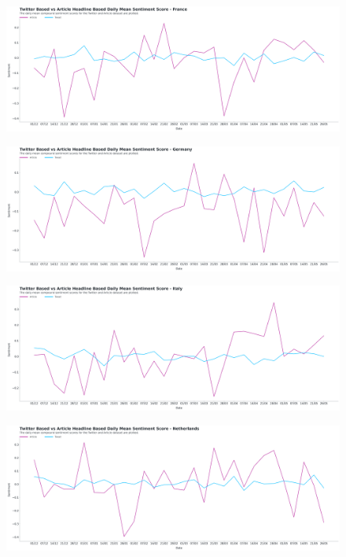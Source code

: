 \begin{landscape}
\begin{figure}[h!]
\includegraphics[scale=0.33]{Daily Mean Article VS Twitter France.png}
\caption[Daily Mean Article VS Twitter]{ }
\label{fig:artcilevstwitterfr}
\end{figure}

\begin{figure}[h!]
\includegraphics[scale=0.33]{Daily Mean Article VS Twitter Germany.png}
\caption[Daily Mean Article VS Twitter]{ }
\label{fig:artcilevstwitterde}
\end{figure}

\begin{figure}[h!]
\includegraphics[scale=0.33]{Daily Mean Article VS Twitter Italy.png}
\caption[Daily Mean Article VS Twitter]{ }
\label{fig:artcilevstwitterit}
\end{figure}

\begin{figure}[h!]
\includegraphics[scale=0.33]{Daily Mean Article VS Twitter Netherlands.png}
\caption[Daily Mean Article VS Twitter]{ }
\label{fig:artcilevstwitternl}
\end{figure}


\end{landscape}
